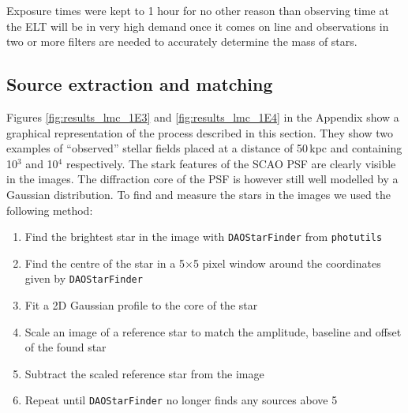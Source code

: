 Exposure times were kept to 1 hour for no other reason than observing time at the ELT will be in very high demand once it comes on line and observations in two or more filters are needed to accurately determine the mass of stars.


\subsection{Source extraction and matching}
Figures \ref{fig:results_lmc_1E3} and \ref{fig:results_lmc_1E4} in the Appendix show a graphical representation of the process described in this section. 
They show two examples of ``observed'' stellar fields placed at a distance of 50\,kpc and containing 10$^3$ and 10$^4$ \spa respectively. 
The stark features of the SCAO PSF
are clearly visible in the images. 
The diffraction core of the PSF is however still well modelled by a Gaussian distribution.
To find and measure the stars in the images we used the following method:

\begin{enumerate}
    \item Find the brightest star in the image with \verb+DAOStarFinder+ from \verb+photutils+ \citep{photutils}
    \item Find the centre of the star in a 5$\times$5 pixel window around the coordinates given by \verb+DAOStarFinder+
    \item Fit a 2D Gaussian profile to the core of the star
    \item Scale an image of a reference star to match the amplitude, baseline and offset of the found star
    \item Subtract the scaled reference star from the image
    \item Repeat until \verb+DAOStarFinder+ no longer finds any sources above 5\,\sig
\end{enumerate}

